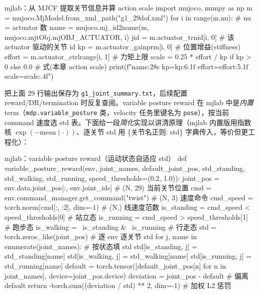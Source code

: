 \begin{codebox}[Python]{mjlab：从 MJCF 提取关节信息并算 action scale}
import mujoco, numpy as np
m = mujoco.MjModel.from_xml_path("g1_29dof.xml")
for i in range(m.nu):                                  # nu = actuator 数
    name = mujoco.mj_id2name(m, mujoco.mjtObj.mjOBJ_ACTUATOR, i)
    jid  = m.actuator_trnid[i, 0]                      # 该 actuator 驱动的关节 id
    kp     = m.actuator_gainprm[i, 0]                  # 位置增益(stiffness)
    effort = m.actuator_ctrlrange[i, 1]               # 力矩上限
    scale  = 0.25 * effort / kp if kp > 0 else 0.0     # 式(本章 action scale)
    print(f"{name:28s} kp={kp:6.1f} effort={effort:5.1f} scale={scale:.4f}")
\end{codebox}

把上面 29 行输出保存为 \texttt{g1\_joint\_summary.txt}，后续配置 reward/DR/termination 时反复查阅。\;variable posture reward 在 mjlab 中是\emph{内置} term（\texttt{mdp.variable\_posture} 类，velocity 任务里键名为 \texttt{pose}），按当前 command 速度选 std 表。下面给一段\emph{简化}实现以讲清原理（mjlab 内置版用指数核 $\exp(-\mathrm{mean}(\cdot))$、逐关节 std 用 \{关节名正则: std\} 字典传入，等价但更工程化）：

\begin{codebox}[Python]{mjlab：variable posture reward（运动状态自适应 std）}
def variable_posture_reward(env, joint_names, default_joint_pos,
                            std_standing, std_walking, std_running,
                            speed_thresholds=(0.2, 1.0)):
    joint_pos = env.data.joint_pos[:, env.joint_ids]          # (N, 29) 当前关节位置
    cmd = env.command_manager.get_command("twist")            # (N, 3) 速度命令
    cmd_speed = torch.norm(cmd[:, :2], dim=-1)                # (N,) 线速度范数
    is_standing = cmd_speed < speed_thresholds[0]             # 站立态
    is_running  = cmd_speed > speed_thresholds[1]             # 跑步态
    is_walking  = ~is_standing & ~is_running                  # 行走态
    std = torch.zeros_like(joint_pos)                         # 逐 env 逐关节 std
    for j, name in enumerate(joint_names):                    # 按状态填 std
        std[is_standing, j] = std_standing[name]
        std[is_walking,  j] = std_walking[name]
        std[is_running,  j] = std_running[name]
    default = torch.tensor([default_joint_pos[n] for n in joint_names],
                           device=joint_pos.device)
    deviation = joint_pos - default                           # 偏离 default
    return -torch.sum((deviation / std) ** 2, dim=-1)         # 加权 L2 惩罚
\end{codebox}

